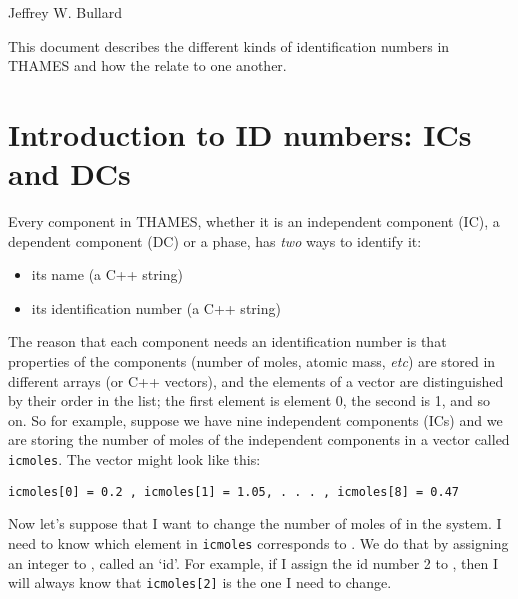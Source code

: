 \documentclass{article}
\begin{document}
\lstset{language=C++,stringstyle=\ttfamily}

\begin{center}
    \Large{\textbf{}}
\end{center}
\begin{center}
    \large{Jeffrey W. Bullard}
\end{center}
\begin{center}
    \large{\DTMnow}
\end{center}

\vspace{0.25truein}
\tableofcontents

\vspace{0.25truein}
This document describes the different kinds of identification numbers in THAMES
and how the relate to one another.

\section{Introduction to ID numbers: ICs and DCs}
Every component in THAMES, whether it is an independent component (IC), a dependent
component (DC) or a phase, has \textit{two} ways to identify it:
\begin{itemize}
    \item its name (a C++ string)
    \item its identification number (a C++ string)
\end{itemize}
The reason that each component needs an identification number is that properties of the
components (number of moles, atomic mass, \textit{etc}) are stored in different
arrays (or C++ vectors), and the elements of a vector are distinguished by their order
in the list; the first element is element 0, the second is 1, and so on.
So for example, suppose we have nine independent components (ICs) and we are
storing the number of moles of the independent components
in a vector called \verb!icmoles!. The vector might look like this:

\begin{verbatim}
icmoles[0] = 0.2 , icmoles[1] = 1.05, . . . , icmoles[8] = 0.47
\end{verbatim}

Now let's suppose that I want to change the number of moles of  in the system.
I need to know which element in \verb!icmoles! corresponds to .  We do that
by assigning an integer to , called an `id'.  For example, if I assign
the id number 2 to , then I will always know that \verb!icmoles[2]! is the one
I need to change.
\end{document}
